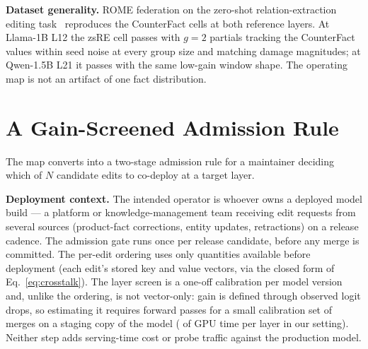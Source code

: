 \documentclass[preprint,12pt]{elsarticle}
\begin{document}
\textbf{Dataset generality.} ROME federation on the zero-shot relation-extraction editing
task~\cite{decao2021} reproduces the CounterFact cells at both reference layers. At
Llama-1B L12 the zsRE cell passes with $g{=}2$ partials \zsrePartialsGtwo{}
tracking the CounterFact values \cfPartialsGtwoForZsre{} within seed noise at every group
size and matching damage magnitudes; at Qwen-1.5B L21 it passes with the same low-gain window
shape. The operating map is not an artifact of one fact distribution.

\section{A Gain-Screened Admission Rule}\label{sec:rule}
The map converts into a two-stage admission rule for a maintainer deciding which of $N$
candidate edits to co-deploy at a target layer.

\textbf{Deployment context.} The intended operator is whoever owns a deployed model
build --- a platform or knowledge-management team receiving edit requests from several
sources (product-fact corrections, entity updates, retractions) on a release cadence.
The admission gate runs once per release candidate, before any merge is committed. The
per-edit ordering uses only quantities available before deployment (each edit's stored
key and value vectors, via the closed form of Eq.~\ref{eq:crosstalk}). The layer screen
is a one-off calibration per model version and, unlike the ordering, is not vector-only:
gain is defined through observed logit drops, so estimating it requires forward passes
for a small calibration set of merges on a staging copy of the model
(\calibTime{} of GPU time per layer in our setting). Neither step adds serving-time cost
or probe traffic against the production model.
\end{document}
